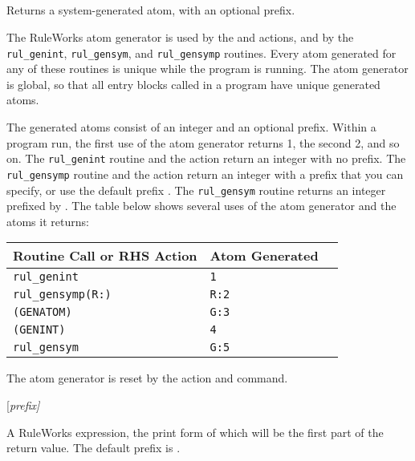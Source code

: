 \subsection{}

Returns a system-generated atom, with an optional prefix.

The RuleWorks atom generator is used by the  and
 actions, and by the \verb|rul_genint|, \verb|rul_gensym|,
and \verb|rul_gensymp| routines. Every atom generated for any of these
routines is unique while the program is running. The atom generator is
global, so that all entry blocks called in a program have unique
generated atoms.

The generated atoms consist of an integer and an optional
prefix. Within a program run, the first use of the atom generator
returns 1, the second 2, and so on. The \verb|rul_genint| routine and
the  action return an integer with no prefix. The
\verb|rul_gensymp| routine and the  action return an
integer with a prefix that you can specify, or use the default prefix
. The \verb|rul_gensym| routine returns an integer prefixed by
. The table below shows several uses of the atom generator and
the atoms it returns:

\begin{center}
  \begin{tabular}{lll}
    \toprule
    Routine Call or RHS Action & Atom Generated \\
    \midrule
    \verb|rul_genint| &  \verb|1| \\
    \verb|rul_gensymp(R:)| & \verb|R:2| \\
    \verb|(GENATOM)| & \verb|G:3| \\
    \verb|(GENINT)| & \verb|4| \\
    \verb|rul_gensym| & \verb|G:5| \\
    \bottomrule
  \end{tabular}
\end{center}

The atom generator is reset by the  action and
command.

\Format

 [\it{prefix}]

\begin{argument}
\item[prefix]

  A RuleWorks expression, the print form of which will be the first
  part of the return value. The default prefix is .
\end{argument}

